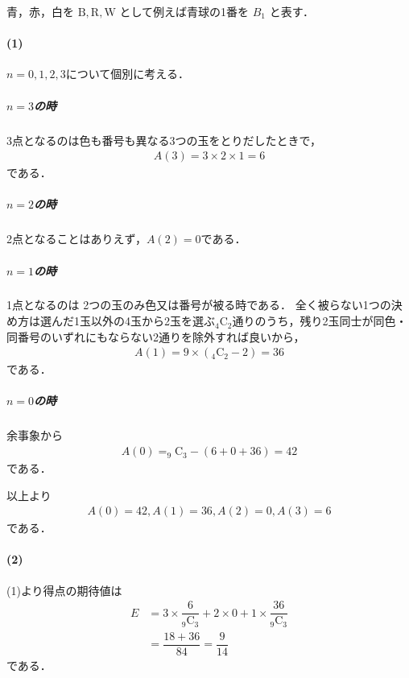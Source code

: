 \documentclass[../../main.tex]{subfiles}
\begin{document}
青，赤，白を $\text{B}, \text{R}, \text{W}$ として例えば青球の1番を $B_1$ と表す．

\paragraph{(1)}

$n=0,1,2,3$について個別に考える．

\subparagraph{$n=3$の時}

$3$点となるのは色も番号も異なる$3$つの玉をとりだしたときで，
\begin{align}
  A(3) = 3 \times 2 \times 1 = 6 \label{eq:1}
\end{align}
である．

\subparagraph{$n=2$の時}

2点となることはありえず，$A(2) = 0$である．

\subparagraph{$n=1$の時}

1点となるのは 2つの玉のみ色又は番号が被る時である．
全く被らない1つの決め方は選んだ1玉以外の4玉から2玉を選ぶ$_4\text{C}_2$通りのうち，残り2玉同士が同色・同番号のいずれにもならない2通りを除外すれば良いから，
\begin{align}
  A(1) = 9 \times (_4\text{C}_2 - 2) = 36 \label{eq:2}
\end{align}
である．

\subparagraph{$n=0$の時}

余事象から
\begin{align}
  A(0) = _9\text{C}_3 - (6 + 0 + 36) = 42 \label{eq:3}
\end{align}
である．
\casesend

以上より
\begin{align}
  A(0)=42, A(1)=36, A(2)=0, A(3)=6
\end{align}
である．

\paragraph{(2)}

(1)より得点の期待値は
\begin{align}
  E
  &= 3 \times \dfrac{6}{_9\text{C}_3} + 2 \times 0 + 1 \times \dfrac{36}{_9\text{C}_3} \\
  &= \dfrac{18 + 36}{84} = \dfrac{9}{14}
\end{align}
である．
\end{document}
